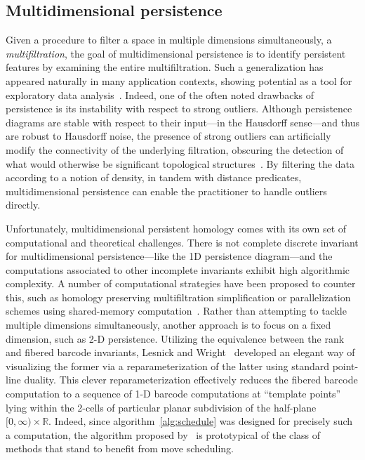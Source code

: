 \documentclass{siamart190516}
\begin{document}
\subsection*{Multidimensional persistence}
Given a procedure to filter a space in multiple dimensions simultaneously, a \emph{multifiltration}, the goal of multidimensional persistence is to identify persistent features by examining the entire multifiltration. 
Such a generalization has appeared naturally in many application contexts, showing potential as a tool for exploratory data analysis~\cite{lesnick2012multidimensional}. 
Indeed, one of the often noted drawbacks of persistence is its instability with respect to strong outliers. 
Although persistence diagrams are stable with respect to their input---in the Hausdorff sense---and thus are robust to Hausdorff noise, the presence of strong outliers can artificially modify the connectivity of the underlying filtration, obscuring the detection of what would otherwise be significant topological structures~\cite{buchet2015topological}. 
By filtering the data according to a notion of density, in tandem with distance predicates, multidimensional persistence can enable the practitioner to handle outliers directly.

Unfortunately, multidimensional persistent homology comes with its own set of computational and theoretical challenges. 
There is not complete discrete invariant for multidimensional persistence---like the 1D persistence diagram---and the computations associated to other incomplete invariants exhibit high algorithmic complexity. A number of computational strategies have been proposed to counter this, such as homology preserving multifiltration simplification or parallelization schemes using shared-memory computation~\cite{fugacci2019chunk}. Rather than attempting to tackle multiple dimensions simultaneously, another approach is to focus on a fixed dimension, such as 2-D persistence. Utilizing the equivalence between the rank and fibered barcode invariants, Lesnick and Wright~\cite{lesnick2015interactive} developed an elegant way of visualizing the former via a reparameterization of the latter using standard point-line duality. This clever reparameterization effectively reduces the fibered barcode computation to a sequence of 1-D barcode computations at ``template points'' lying within the 2-cells of particular planar subdivision of the half-plane $[0, \infty) \times \mathbb{R}$. Indeed, since algorithm~\ref{alg:schedule} was designed for precisely such a computation, the algorithm proposed by~\cite{lesnick2015interactive} is prototypical of the class of methods that stand to benefit from move scheduling. 
\end{document}

